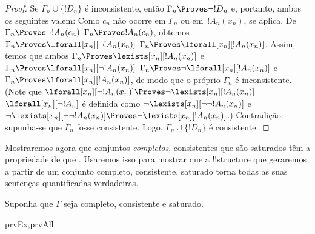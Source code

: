 \documentclass[../../../include/open-logic-section]{subfiles}
\begin{document}
\begin{proof}
Se $\Gamma_n \cup \{!D_n\}$ é inconsistente, então $\Gamma_n
\Proves \lnot !D_n$ e, portanto, ambos os seguintes valem:
Como $c_n$ não ocorre em
$\Gamma_n$ ou em~$!A_n(x_n)$, 
 se aplica.
De 
{$\Gamma_n \Proves \lnot !A_n(c_n)$}
{$\Gamma_n \Proves !A_n(c_n)$},
obtemos
{$\Gamma_n \Proves \lforall[x_n][\lnot !A_n(x_n)]$}
{$\Gamma_n \Proves \lforall[x_n][!A_n(x_n)]$}.
Assim, temos que ambos
{$\Gamma_n \Proves \lexists[x_n][!A_n(x_n)]$ e
$\Gamma_n \Proves \lforall[x_n][\lnot !A_n(x_n)]$}
{$\Gamma_n \Proves \lnot\lforall[x_n][!A_n(x_n)]$ e
$\Gamma_n \Proves \lforall[x_n][!A_n(x_n)]$},
de modo que o próprio $\Gamma_n$ é inconsistente.
{(Note que
{$\lforall[x_n][\lnot !A_n(x_n)] \Proves
  \lnot\lexists[x_n][!A_n(x_n)]$}
{$\lforall[x_n][\lnot !A_n]$ é definida como
  $\lnot\lexists[x_n][\lnot\lnot !A_n(x_n)]$ e
  $\lnot\lexists[x_n][\lnot\lnot !A_n(x_n)] \Proves
  \lnot\lexists[x_n][!A_n(x_n)]$}.)}{}
Contradição: supunha-se que $\Gamma_n$ fosse consistente.  Logo,
$\Gamma_n \cup \{ !D_n\}$ é consistente.
\end{proof}

\begin{explain}
Mostraremos agora que conjuntos \emph{completos}, consistentes que são
saturados têm a propriedade de que . Usaremos isso para mostrar que a !!{structure} que
geraremos a partir de um conjunto completo, consistente, saturado torna todas as suas
sentenças quantificadas verdadeiras.
\end{explain}

\begin{prop}
Suponha que $\Gamma$ seja completo, consistente e saturado.
\begin{tagenumerate}{prvEx,prvAll}
\end{tagenumerate}
\end{prop}
\end{document}
